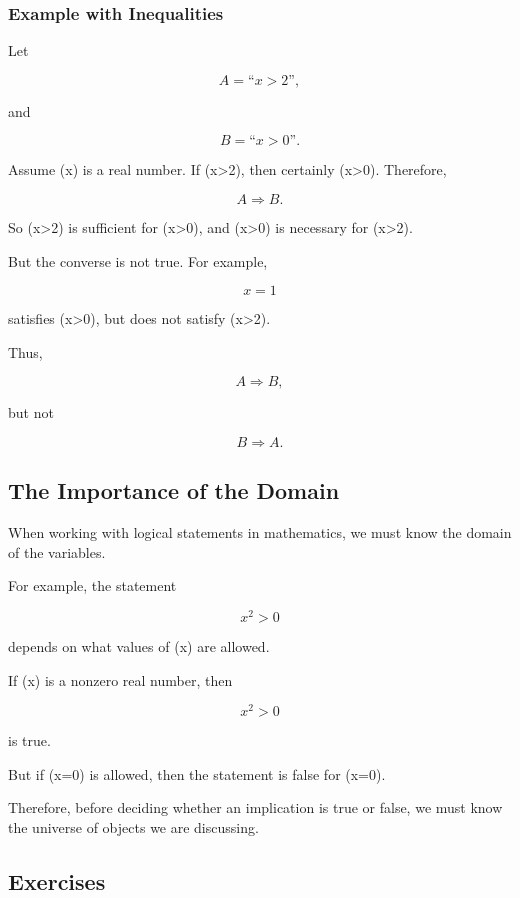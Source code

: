 \subsubsection{Example with Inequalities}

Let

\[
A = \text{``$x>2$''},
\]

and

\[
B = \text{``$x>0$''}.
\]

Assume (x) is a real number. If (x>2), then certainly (x>0). Therefore,

\[
A \Rightarrow B.
\]

So (x>2) is sufficient for (x>0), and (x>0) is necessary for (x>2).

But the converse is not true. For example,

\[
x=1
\]

satisfies (x>0), but does not satisfy (x>2).

Thus,

\[
A \Rightarrow B,
\]

but not

\[
B \Rightarrow A.
\]

\subsection{The Importance of the Domain}

When working with logical statements in mathematics, we must know the domain of
the variables.

For example, the statement

\[
x^2 > 0
\]

depends on what values of (x) are allowed.

If (x) is a nonzero real number, then

\[
x^2>0
\]

is true.

But if (x=0) is allowed, then the statement is false for (x=0).

Therefore, before deciding whether an implication is true or false, we must know
the universe of objects we are discussing.

\subsection{Exercises}

